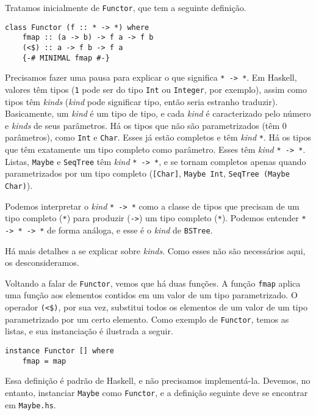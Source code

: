 \documentclass[a4paper]{article}
\begin{document}
Tratamos inicialmente de \texttt{Functor}, que tem a seguinte definição.

\begin{verbatim}
class Functor (f :: * -> *) where
	fmap :: (a -> b) -> f a -> f b
	(<$) :: a -> f b -> f a
	{-# MINIMAL fmap #-}
\end{verbatim}

Precisamos fazer uma pausa para explicar o que significa \texttt{* -> *}.
Em Haskell, valores têm tipos (\texttt{1} pode ser do tipo \texttt{Int} ou \texttt{Integer}, por exemplo), assim como tipos têm \emph{kinds} (\emph{kind} pode significar tipo, então seria estranho traduzir).
Basicamente, um \emph{kind} é um tipo de tipo, e cada \emph{kind} é caracterizado pelo número e \emph{kinds} de seus parâmetros.
Há os tipos que não são parametrizados (têm 0 parâmetros), como \texttt{Int} e \texttt{Char}.
Esses já estão completos e têm \emph{kind} \texttt{*}.
Há os tipos que têm exatamente um tipo completo como parâmetro.
Esses têm \emph{kind} \texttt{* -> *}.
Listas, \texttt{Maybe} e \texttt{SeqTree} têm \emph{kind} \mbox{\texttt{* -> *}}, e se tornam completos apenas quando parametrizados por um tipo completo (\texttt{[Char]}, \texttt{Maybe Int}, \texttt{SeqTree (Maybe Char)}).

Podemos interpretar o \emph{kind} \texttt{* -> *} como a classe de tipos que precisam de um tipo completo (\texttt{*}) para produzir (\texttt{->}) um tipo completo (\texttt{*}).
Podemos entender \texttt{* -> * -> *} de forma análoga, e esse é o \emph{kind} de \texttt{BSTree}.

Há mais detalhes a se explicar sobre \emph{kinds}.
Como esses não são necessários aqui, os desconsideramos.

Voltando a falar de \texttt{Functor}, vemos que há duas funções.
A função \texttt{fmap} aplica uma função aos elementos contidos em um valor de um tipo parametrizado.
O operador \texttt{(<\$)}, por sua vez, substitui todos os elementos de um valor de um tipo parametrizado por um certo elemento.
Como exemplo de \texttt{Functor}, temos as listas, e sua instanciação é ilustrada a seguir.

\begin{verbatim}
instance Functor [] where
	fmap = map
\end{verbatim}

Essa definição é padrão de Haskell, e não precisamos implementá-la.
Devemos, no entanto, instanciar \texttt{Maybe} como \texttt{Functor}, e a definição seguinte deve se encontrar em \texttt{Maybe.hs}.
\end{document}
